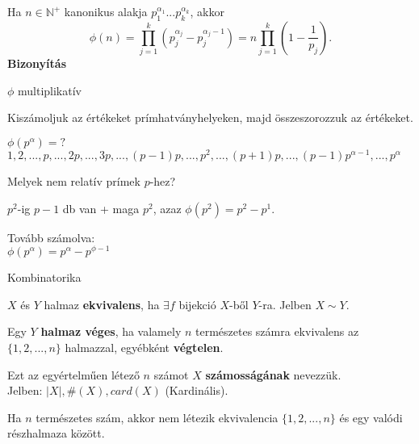 \begin{frame}
  \begin{tcolorbox}[title={Tétel: ${\phi}$(n) kiszámolása}]
    Ha $n \in \mathbb{N}^+$ kanonikus alakja $p_1^{{\alpha}_1}...p_k^{{\alpha}_k}$, akkor\\
    $${\phi}(n) = \prod^k_{j=1} (p_j^{{\alpha}_j} - p_j^{{\alpha}_j - 1}) = n \prod^k_{j=1} (1 - \frac{1}{p_j}).$$
  \tcblower
    \textbf{Bizonyítás}
    \mmedskip
    
    $\phi$ multiplikatív\\
    \msmallskip
    
    Kiszámoljuk az értékeket prímhatványhelyeken, majd összeszorozzuk az értékeket.\\
    \msmallskip
    
    ${\phi}(p^{\alpha}) = ?$\\
    $1, 2, ..., p, ..., 2p, ..., 3p, ..., (p-1)p, ..., p^2, ..., (p+1)p, ..., (p-1)p^{{\alpha}-1}, ..., p^{\alpha}$\\
    \msmallskip
    
    Melyek nem relatív prímek $p$-hez?\\
    \msmallskip
    
    $p^2$-ig $p - 1$ db van + maga $p^2$, azaz ${\phi}(p^2) = p^2 - p^1$.\\
    \msmallskip
    
    Tovább számolva:\\
    ${\phi}(p^{\alpha}) = p^{\alpha} - p^{\phi - 1}$
  \end{tcolorbox}
\end{frame}

\begin{frame}[plain]
  \begin{tcolorbox}[center, colback={myyellow}, coltext={black}, colframe={myyellow}]
      {\Huge Kombinatorika}
      \mmedskip
  \end{tcolorbox}
\end{frame}


\begin{frame}
  \begin{tcolorbox}[title={Def.: Halmazok ekvivalenciája}]
    $X$ és $Y$ halmaz \textbf{ekvivalens}, ha ${\exists} f$ bijekció $X$-ből $Y$-ra. Jelben $X \sim Y$.\\
    \mmedskip

    Egy $Y$ \textbf{halmaz véges}, ha valamely $n$ természetes számra ekvivalens az $\{ 1, 2, ..., n \}$ halmazzal, egyébként \textbf{végtelen}.\\
    \mmedskip

    Ezt az egyértelműen létező $n$ számot $X$ \textbf{számosságának} nevezzük.\\
    Jelben: $|X|, \#(X), card(X)$ (Kardinális).
  \end{tcolorbox}

  \begin{tcolorbox}[title={Tétel: Véges halmaz valódi részhalmaza}]
    Ha $n$ természetes szám, akkor nem létezik ekvivalencia $\{ 1, 2, ..., n \}$ és egy valódi részhalmaza között.
  \end{tcolorbox}
\end{frame}

